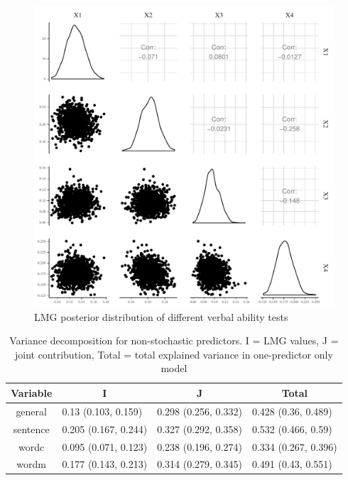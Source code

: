 \documentclass[11pt,a4paper,twoside]{book}\usepackage[]{graphicx}\usepackage[]{color}
\newenvironment{knitrout}{}{} %
\begin{document}
\begin{knitrout}
\color{fgcolor}\begin{figure}

{\centering \includegraphics[width=\textwidth-3cm]{figure/ch03_figempi_lmg_plot-1} 

}

\caption[LMG posterior distribution of different verbal ability tests]{LMG posterior distribution of different verbal ability tests}\label{fig:empi.lmg.plot}
\end{figure}


\end{knitrout}


\begin{table}[h]
\caption{Variance decomposition for non-stochastic predictors. I = LMG values, J = joint contribution, Total = total explained variance in one-predictor only model}
\centering
\begin{tabular}{clll}
  \toprule
  \multicolumn{1}{c}{\textbf{Variable}} & \multicolumn{1}{c}{\textbf{I}} &\multicolumn{1}{c}{\textbf{J}} & \multicolumn{1}{c}{\textbf{Total}} \\
  \hline
general & 0.13 (0.103, 0.159)  & 0.298 (0.256, 0.332)   & 0.428 (0.36, 0.489)  \\ 
sentence & 0.205 (0.167, 0.244)  & 0.327 (0.292, 0.358)   & 0.532 (0.466, 0.59)  \\ 
wordc & 0.095 (0.071, 0.123)  & 0.238 (0.196, 0.274)   & 0.334 (0.267, 0.396)  \\ 
wordm & 0.177 (0.143, 0.213)  & 0.314 (0.279, 0.345)   & 0.491 (0.43, 0.551)  \\ 
   \bottomrule
\end{tabular}
\label{tbl:empirical.ijt}
\end{table}
\end{document}
